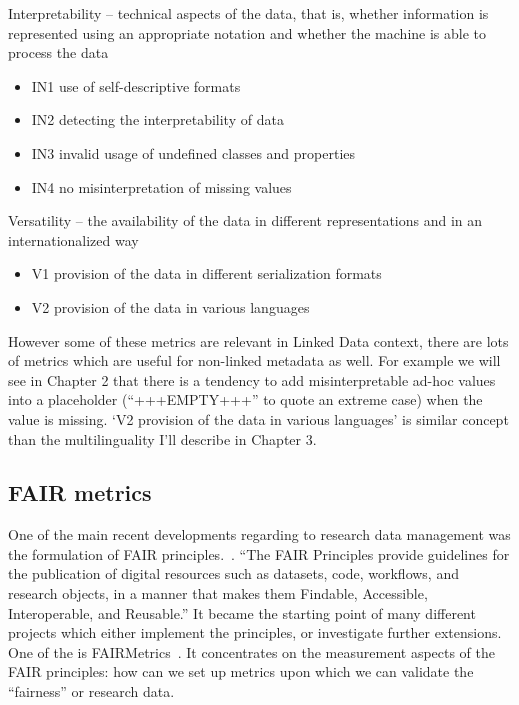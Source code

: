 Interpretability -- technical aspects of the data, that is, whether information is represented using an appropriate notation and whether the machine is able to process the data
\begin{itemize}
 \setlength{\parskip}{0pt}
 \setlength{\itemsep}{0pt plus 1pt}
 \item IN1 use of self-descriptive formats
 \item IN2 detecting the interpretability of data
 \item IN3 invalid usage of undefined classes and properties
 \item IN4 no misinterpretation of missing values
\end{itemize}

Versatility -- the availability of the data in different representations and in an internationalized way
\vspace{0mm}
\begin{itemize}
 \setlength{\parskip}{0pt}
 \setlength{\itemsep}{0pt plus 1pt}
 \item V1 provision of the data in different serialization formats
 \item V2 provision of the data in various languages
\end{itemize}

However some of these metrics are relevant in Linked Data context, there are lots of metrics which are useful for non-linked metadata as well. For example we will see in Chapter 2 that there is a tendency to add misinterpretable ad-hoc values into a placeholder (``+++EMPTY+++'' to quote an extreme case) when the value is missing. `V2 provision of the data in various languages' is similar concept than the multilinguality I'll describe in Chapter 3.

\subsection{FAIR metrics}

One of the main recent developments regarding to research data management was the formulation of FAIR principles.~\cite{wilkinson2016}. ``The FAIR Principles provide guidelines for the publication of digital resources such as datasets, code, workflows, and research objects, in a manner that makes them Findable, Accessible, Interoperable, and Reusable.'' It became the starting point of many different projects which either implement the principles, or investigate further extensions. One of the is FAIRMetrics~\cite{wilkinson2018, fairmetrics}. It concentrates on the measurement aspects of the FAIR principles: how can we set up metrics upon which we can validate the ``fairness'' or research data.

